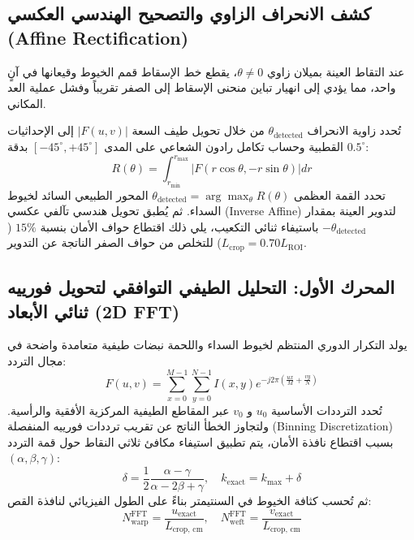 \documentclass[11pt,a4paper]{article}
\begin{document}
\subsection{كشف الانحراف الزاوي والتصحيح الهندسي العكسي (Affine Rectification)}
عند التقاط العينة بميلان زاوي $\theta \ne 0$، يقطع خط الإسقاط قمم الخيوط وقيعانها في آنٍ واحد، مما يؤدي إلى انهيار تباين منحنى الإسقاط إلى الصفر تقريباً وفشل عملية العد المكاني.

تُحدد زاوية الانحراف $\theta_{\text{detected}}$ من خلال تحويل طيف السعة $|F(u, v)|$ إلى الإحداثيات القطبية وحساب تكامل رادون الشعاعي على المدى $[-45^\circ, +45^\circ]$ بدقة $0.5^\circ$:
\begin{equation}
    R(\theta) = \int_{r_{\min}}^{r_{\max}} \left| F\left( r \cos\theta, -r \sin\theta \right) \right| dr
\end{equation}
تحدد القمة العظمى $\theta_{\text{detected}} = \arg\max_\theta R(\theta)$ المحور الطبيعي السائد لخيوط السداء. ثم يُطبق تحويل هندسي تآلفي عكسي (Inverse Affine) لتدوير العينة بمقدار $-\theta_{\text{detected}}$ باستيفاء ثنائي التكعيب، يلي ذلك اقتطاع حواف الأمان بنسبة $15\%$ ($L_{\text{crop}} = 0.70 L_{\text{ROI}}$) للتخلص من حواف الصفر الناتجة عن التدوير.

\subsection{المحرك الأول: التحليل الطيفي التوافقي لتحويل فورييه ثنائي الأبعاد (2D FFT)}
يولد التكرار الدوري المنتظم لخيوط السداء واللحمة نبضات طيفية متعامدة واضحة في مجال التردد:
\begin{equation}
    F(u, v) = \sum_{x=0}^{M-1} \sum_{y=0}^{N-1} I(x, y) e^{-j 2\pi \left(\frac{ux}{M} + \frac{vy}{N}\right)}
\end{equation}
تُحدد الترددات الأساسية $u_0$ و $v_0$ عبر المقاطع الطيفية المركزية الأفقية والرأسية. ولتجاوز الخطأ الناتج عن تقريب ترددات فورييه المنفصلة (Binning Discretization) بسبب اقتطاع نافذة الأمان، يتم تطبيق استيفاء مكافئ ثلاثي النقاط حول قمة التردد $(\alpha, \beta, \gamma)$:
\begin{equation}
    \delta = \frac{1}{2} \frac{\alpha - \gamma}{\alpha - 2\beta + \gamma}, \quad k_{\text{exact}} = k_{\max} + \delta
\end{equation}
ثم تُحسب كثافة الخيوط في السنتيمتر بناءً على الطول الفيزيائي لنافذة القص:
\begin{equation}
    N_{\text{warp}}^{\text{FFT}} = \frac{u_{\text{exact}}}{L_{\text{crop, cm}}}, \quad N_{\text{weft}}^{\text{FFT}} = \frac{v_{\text{exact}}}{L_{\text{crop, cm}}}
\end{equation}
\end{document}
